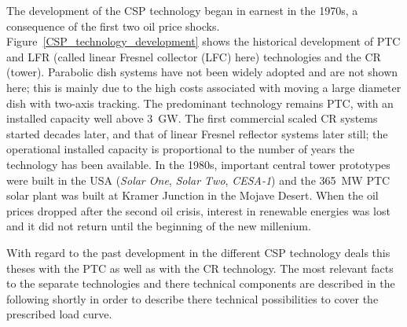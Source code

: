 The development of the CSP technology began in earnest in the 1970s, a consequence of the first two oil price shocks. Figure~\ref{CSP_technology_development} shows the historical development of PTC and LFR (called linear Fresnel collector (LFC) here) technologies and the CR (tower). Parabolic dish systems have not been widely adopted and are not shown here; this is mainly due to the high costs associated with moving a large diameter dish with two-axis tracking. The predominant technology remains PTC, with an installed capacity well above \SI{3}{GW}. The first commercial scaled CR systems started decades later, and that of linear Fresnel reflector systems later still; the operational installed capacity is proportional to the number of years the technology has been available. In the 1980s, important central tower prototypes were built in the USA (\emph{Solar One}, \emph{Solar Two}, \emph{CESA-1}) and the \SI{365}{\mega\watt} PTC solar plant was built at Kramer Junction in the Mojave Desert. When the oil prices dropped after the second oil crisis, interest in renewable energies was lost and it did not return until the beginning of the new millenium. 

With regard to the past development in the different CSP technology deals this theses with the PTC as well as with the CR technology. The most relevant facts to the separate technologies and there technical components are described in the following shortly in order to describe there technical possibilities to cover the prescribed load curve. 


